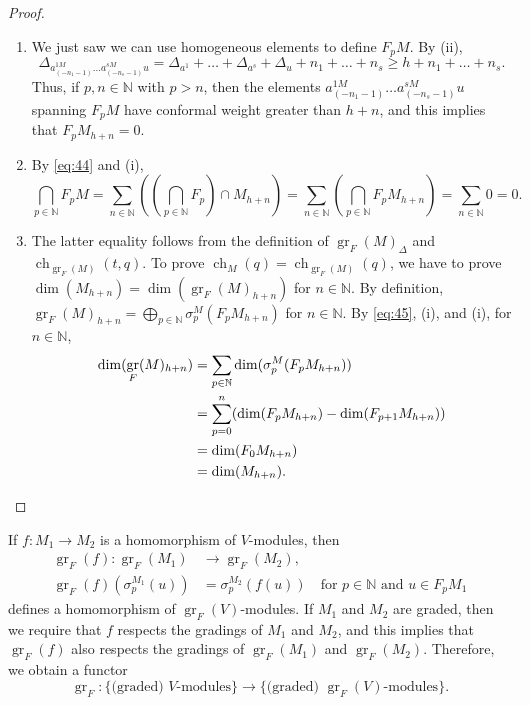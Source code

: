 \documentclass[a4paper, 12pt, reqno]{amsart}
\theoremstyle{remark}
\DeclareMathOperator{\gr}{gr}
\DeclareMathOperator{\ch}{ch}
\begin{document}
\begin{proof}\leavevmode
  \begin{enumerate}
  \item We just saw we can use homogeneous elements to define $F_pM$.
    By (ii),
    \begin{equation*}
      \Delta_{a^{1M}_{(-n_1 - 1)}\dots a^{sM}_{(-n_s - 1)}u} = \Delta_{a^1} + \dots + \Delta_{a^s} + \Delta_u + n_1 + \dots + n_s \ge h + n_1 + \dots + n_s.
    \end{equation*}
    Thus, if $p, n \in \mathbb{N}$ with $p > n$, then the elements $a^{1M}_{(-n_1 - 1)}\dots a^{sM}_{(-n_s - 1)}u$ spanning $F_pM$ have conformal weight greater than $h + n$, and this implies that $F_pM_{h + n} = 0$.
  \item By \eqref{eq:44} and (i),
    \begin{equation*}
      \bigcap_{p \in \mathbb{N}}F_pM = \sum_{n \in \mathbb{N}}\left(\left(\bigcap_{p \in \mathbb{N}}F_p\right) \cap M_{h + n}\right) = \sum_{n \in \mathbb{N}}\left(\bigcap_{p \in \mathbb{N}}F_pM_{h + n}\right) = \sum_{n \in \mathbb{N}}0 = 0.
    \end{equation*}
  \item The latter equality follows from the definition of $\gr_F(M)_{\Delta}$ and $\ch_{\gr_F(M)}(t, q)$.
    To prove $\ch_M(q) = \ch_{\gr_F(M)}(q)$, we have to prove $\dim(M_{h + n}) = \dim(\gr_F(M)_{h + n})$ for $n \in \mathbb{N}$.
    By definition, $\gr_F(M)_{h + n} = \bigoplus_{p \in \mathbb{N}}\sigma^M_p(F_pM_{h + n})$ for $n \in \mathbb{N}$.
    By \eqref{eq:45}, (i), and (i), for $n \in \mathbb{N}$,
    \begin{align*}
      \dim(\gr_F(M)_{h + n}) &= \sum_{p \in \mathbb{N}}\dim(\sigma^M_p(F_pM_{h + n})) \\
                             &= \sum_{p = 0}^n(\dim(F_pM_{h + n}) - \dim(F_{p + 1}M_{h + n})) \\
                             &= \dim(F_0M_{h + n}) \\
                             &= \dim(M_{h + n}). \qedhere
    \end{align*}
  \end{enumerate}
\end{proof}

If $f: M_1 \to M_2$ is a homomorphism of $V$-modules, then
\begin{align*}
  \gr_F(f): \gr_F(M_1) &\to \gr_F(M_2), \\
  \gr_F(f)(\sigma^{M_1}_p(u)) &= \sigma^{M_2}_p(f(u)) \quad \text{for $p \in \mathbb{N}$ and $u \in F_pM_1$}
\end{align*}
defines a homomorphism of $\gr_F(V)$-modules.
If $M_1$ and $M_2$ are graded, then we require that $f$ respects the gradings of $M_1$ and $M_2$, and this implies that $\gr_F(f)$ also respects the gradings of $\gr_F(M_1)$ and $\gr_F(M_2)$.
Therefore, we obtain a functor
\begin{equation*}
  \gr_F: \{\text{(graded) $V$-modules}\} \to \{\text{(graded) $\gr_F(V)$-modules}\}.
\end{equation*}
\end{document}
